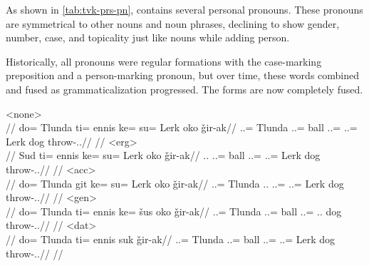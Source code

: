 As shown in \autoref{tab:tvk-prs-pn}, \langtvk{} contains several personal pronouns. These pronouns are symmetrical to other nouns and noun phrases\autocite{wals-50}, declining to show gender, number, case, and topicality just like nouns while adding person.

Historically, all pronouns were regular formations with the case-marking preposition and a person-marking pronoun, but over time, these words combined and fused as grammaticalization progressed. The forms are now completely fused.

	\a<none>\begingl
		\glpreamble{}\\
		//
		\gla do= Tlunda ti= ennis ke= su= Lerk oko ǧir-ak//
		\glb \An.\Sg.\Erg= Tlunda \In.\Sg.\Acc= ball \An.\Sg.\Dat= \An.\Sg.\Gen= Lerk dog throw-\Ind.\Pst.\Pfv//
		\glft{}//
	\endgl
	\a<erg>\begingl
		\glpreamble{}\\
		//
		\gla Sud ti= ennis ke= su= Lerk oko ǧir-ak//
		\glb \Tps.\An.\Erg{} \In.\Sg.\Acc= ball \An.\Sg.\Dat= \An.\Sg.\Gen= Lerk dog throw-\Ind.\Pst.\Pfv//
		\glft{}//
	\endgl
	\a<acc>\begingl
		\glpreamble{}\\
		//
		\gla do= Tlunda git ke= su= Lerk oko ǧir-ak//
		\glb \An.\Sg.\Erg= Tlunda \Tps.\In.\Acc{} \An.\Sg.\Dat= \An.\Sg.\Gen= Lerk dog throw-\Ind.\Pst.\Pfv//
		\glft{}//
	\endgl
	\a<gen>\begingl
		\glpreamble{}\\
		//
		\gla do= Tlunda ti= ennis ke= šus oko ǧir-ak//
		\glb \An.\Sg.\Erg= Tlunda \In.\Sg.\Acc= ball \An.\Sg.\Dat= \Tps.\An.\Gen{} dog throw-\Ind.\Pst.\Pfv//
		\glft{}//
	\endgl
	\a<dat>\begingl
		\glpreamble{}\\
		//
		\gla do= Tlunda ti= ennis suk ǧir-ak//
		\glb \An.\Sg.\Erg= Tlunda \In.\Sg.\Acc= ball \An.\Sg.\Dat= \An.\Sg.\Gen= Lerk dog throw-\Ind.\Pst.\Pfv//
		\glft{}//
	\endgl
\xe

